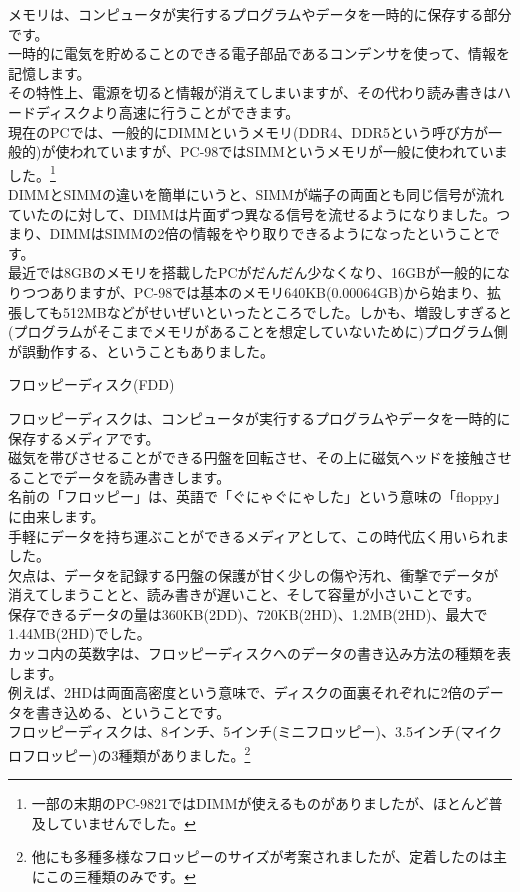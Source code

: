 \documentclass[b5paper,9pt,platex,dvipdfmx]{jsarticle}
\begin{document}
\begin{multicols*}{3}
\begin{enumerate}
  メモリは、コンピュータが実行するプログラムやデータを一時的に保存する部分です。\\
  一時的に電気を貯めることのできる電子部品であるコンデンサを使って、情報を記憶します。\\
  その特性上、電源を切ると情報が消えてしまいますが、その代わり読み書きはハードディスクより高速に行うことができます。\\
  現在のPCでは、一般的にDIMMというメモリ(DDR4、DDR5という呼び方が一般的)が使われていますが、PC-98ではSIMMというメモリが一般に使われていました。\footnote{一部の末期のPC-9821ではDIMMが使えるものがありましたが、ほとんど普及していませんでした。}\\
  DIMMとSIMMの違いを簡単にいうと、SIMMが端子の両面とも同じ信号が流れていたのに対して、DIMMは片面ずつ異なる信号を流せるようになりました。つまり、DIMMはSIMMの2倍の情報をやり取りできるようになったということです。\\
  最近では8GBのメモリを搭載したPCがだんだん少なくなり、16GBが一般的になりつつありますが、PC-98では基本のメモリ640KB(0.00064GB)から始まり、拡張しても512MBなどがせいぜいといったところでした。しかも、増設しすぎると(プログラムがそこまでメモリがあることを想定していないために)プログラム側が誤動作する、ということもありました。\\
  {\bf  \item フロッピーディスク(FDD)\\}
  フロッピーディスクは、コンピュータが実行するプログラムやデータを一時的に保存するメディアです。\\
  磁気を帯びさせることができる円盤を回転させ、その上に磁気ヘッドを接触させることでデータを読み書きします。\\
  名前の「フロッピー」は、英語で「ぐにゃぐにゃした」という意味の「floppy」に由来します。\\
  手軽にデータを持ち運ぶことができるメディアとして、この時代広く用いられました。\\
  欠点は、データを記録する円盤の保護が甘く少しの傷や汚れ、衝撃でデータが消えてしまうことと、読み書きが遅いこと、そして容量が小さいことです。\\
  保存できるデータの量は360KB(2DD)、720KB(2HD)、1.2MB(2HD)、最大で1.44MB(2HD)でした。\\
  カッコ内の英数字は、フロッピーディスクへのデータの書き込み方法の種類を表します。\\
  例えば、2HDは両面高密度という意味で、ディスクの面裏それぞれに2倍のデータを書き込める、ということです。\\
  フロッピーディスクは、8インチ、5インチ(ミニフロッピー)、3.5インチ(マイクロフロッピー)の3種類がありました。\footnote{他にも多種多様なフロッピーのサイズが考案されましたが、定着したのは主にこの三種類のみです。}\\

\end{enumerate}
\end{multicols*}
\end{document}
